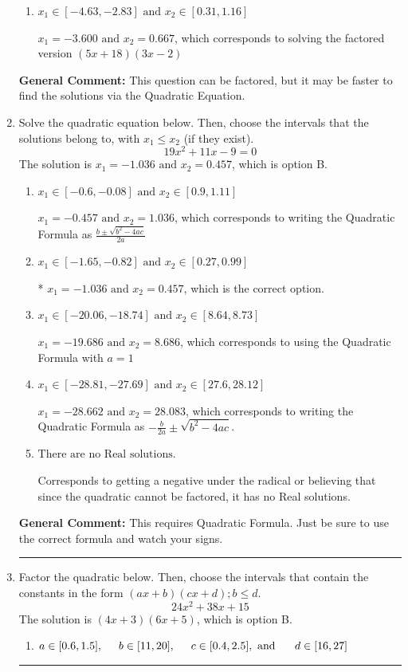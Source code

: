 \documentclass{extbook}[14pt]
\newcommand{\litem}[1]{\item #1

\rule{\textwidth}{0.4pt}}
\begin{document}
\begin{enumerate}
{\begin{enumerate}[label=\Alph*.]
$x_1 = -9.000 \text{ and } x_2 = 0.267$, which corresponds to solving the factored version $(x + 9)(15x -4)$
\item \( x_1 \in [-4.63, -2.83] \text{ and } x_2 \in [0.31, 1.16] \)

$x_1 = -3.600 \text{ and } x_2 = 0.667$, which corresponds to solving the factored version $(5x + 18)(3x -2)$
\end{enumerate}

\textbf{General Comment:} This question can be factored, but it may be faster to find the solutions via the Quadratic Equation.
}
\litem{
Solve the quadratic equation below. Then, choose the intervals that the solutions belong to, with $x_1 \leq x_2$ (if they exist).
\[ 19x^{2} +11 x -9 = 0 \]The solution is \( x_1 = -1.036 \text{ and } x_2 = 0.457 \), which is option B.\begin{enumerate}[label=\Alph*.]
\item \( x_1 \in [-0.6, -0.08] \text{ and } x_2 \in [0.9, 1.11] \)

 $x_1 = -0.457 \text{ and } x_2 = 1.036$, which corresponds to writing the Quadratic Formula as $\frac{b \pm \sqrt{b^2 - 4ac}}{2a}$
\item \( x_1 \in [-1.65, -0.82] \text{ and } x_2 \in [0.27, 0.99] \)

* $x_1 = -1.036 \text{ and } x_2 = 0.457$, which is the correct option.
\item \( x_1 \in [-20.06, -18.74] \text{ and } x_2 \in [8.64, 8.73] \)

 $x_1 = -19.686 \text{ and } x_2 = 8.686$, which corresponds to using the Quadratic Formula with $a=1$
\item \( x_1 \in [-28.81, -27.69] \text{ and } x_2 \in [27.6, 28.12] \)

 $x_1 = -28.662 \text{ and } x_2 = 28.083$, which corresponds to writing the Quadratic Formula as $-\frac{b}{2a} \pm \sqrt{b^2 - 4ac}$.
\item \( \text{There are no Real solutions.} \)

Corresponds to getting a negative under the radical or believing that since the quadratic cannot be factored, it has no Real solutions.
\end{enumerate}

\textbf{General Comment:} This requires Quadratic Formula. Just be sure to use the correct formula and watch your signs.
}
\litem{
Factor the quadratic below. Then, choose the intervals that contain the constants in the form $(ax+b)(cx+d); b \leq d.$
\[ 24x^{2} +38 x + 15 \]The solution is \( (4x + 3)(6x + 5) \), which is option B.\begin{enumerate}[label=\Alph*.]
\item \( a \in [0.6, 1.5], \hspace*{5mm} b \in [11, 20], \hspace*{5mm} c \in [0.4, 2.5], \text{ and } \hspace*{5mm} d \in [16, 27] \)


\end{enumerate}}
\end{enumerate}
\end{document}
